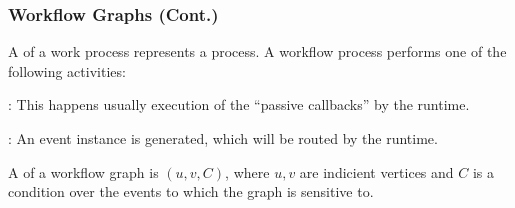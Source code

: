 \documentclass{beamer}
\begin{document}
\begin{frame}[fragile]
\frametitle{Workflow Graphs (Cont.)}

A  of a work process represents a process. A workflow process
performs one of the following activities:

\vspace*{0.3cm}

\bit
\w {}: This happens usually execution of the ``passive
callbacks'' by the runtime.

\vspace*{0.3cm}

\w {}: An event instance is generated, which will
be routed by the runtime.

\eit

\vspace*{0.4cm}

A  of a workflow graph is $(u, v, C)$, where $u, v$ are
indicient vertices and $C$ is a condition over the events to which the graph
is sensitive to.

\end{frame}


%
%





\end{document}

